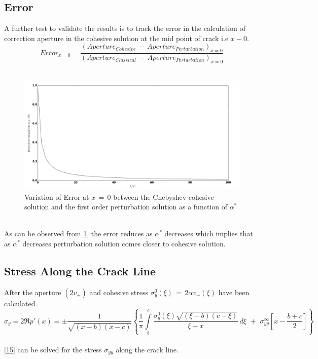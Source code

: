 \documentclass[authoryear,12pt]{elsarticle}
\begin{document}
	\subsection{Error}
		A further test to validate the results is to track the error in the calculation of correction aperture in the cohesive solution at the mid point of crack i.e \(x-0\).
		\begin{equation*}
			Error_{x=0} = \frac{(Aperture_{Cohesive}\,-\,Aperture_{Perturbation})_{x=0}}{(Aperture_{Classical}\,-\,Aperture_{Perturbation})_{x=0}}
		\end{equation*}
		\\
		\begin{figure}[h!]
            \includegraphics[width=1\linewidth]{Error.jpg}
            \caption{Variation of Error at \(x \,=\, 0\) between the Chebyshev cohesive solution and the first order perturbation solution as a function of \(\alpha^*\)}
			\label{Error}
		\end{figure}
		\\
		As can be observed from \cref{Error}, the error reduces as \(\alpha^*\) decreases which implies that as \(\alpha^*\) decreases perturbation solution comes closer to cohesive solution.
	\newpage
	\subsection{Stress Along the Crack Line}
		After the aperture \((2v_{+})\) and cohesive stress \(\sigma^{0}_{y}(\xi)\,=\,2\alpha v_{+}(\xi)\) have been calculated.
		\begin{equation}\label{15}
			\sigma_y = 2\Re p'(x) = \pm \frac{1}{\sqrt{(x-b)(x-c)}}\left\{ \frac{1}{\pi}\int\limits_{b}^c \frac{\sigma_y^0(\xi)\sqrt{(\xi-b)(c-\xi)}}{\xi-x}\,d\xi \,\,+\,\, \sigma^{\infty}_{yy}[x-\frac{b+c}{2}]\right\}
		\end{equation}
		\\
		\cref{15} can be solved for the stress \(\sigma_{yy}\) along the crack line.\\
\end{document}
